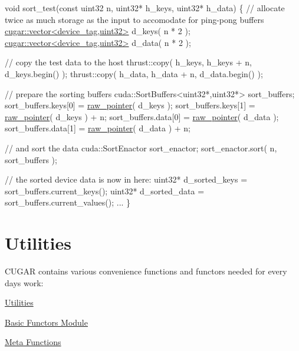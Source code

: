 \begin{DoxyCode}
\textcolor{keywordtype}{void} sort\_test(\textcolor{keyword}{const} uint32 n, uint32* h\_keys, uint32* h\_data)
\{
    \textcolor{comment}{// allocate twice as much storage as the input to accomodate for ping-pong buffers}
    \hyperlink{structcugar_1_1vector}{cugar::vector<device\_tag,uint32>} d\_keys( n * 2 );
    \hyperlink{structcugar_1_1vector}{cugar::vector<device\_tag,uint32>} d\_data( n * 2 );

    \textcolor{comment}{// copy the test data to the host}
    thrust::copy( h\_keys, h\_keys + n, d\_keys.begin() );
    thrust::copy( h\_data, h\_data + n, d\_data.begin() );

    \textcolor{comment}{// prepare the sorting buffers}
    cuda::SortBuffers<uint32*,uint32*> sort\_buffers;
    sort\_buffers.keys[0] = \hyperlink{namespacecugar_a3f6cb2c817f2ba065931cec569aa848b}{raw\_pointer}( d\_keys );
    sort\_buffers.keys[1] = \hyperlink{namespacecugar_a3f6cb2c817f2ba065931cec569aa848b}{raw\_pointer}( d\_keys ) + n;
    sort\_buffers.data[0] = \hyperlink{namespacecugar_a3f6cb2c817f2ba065931cec569aa848b}{raw\_pointer}( d\_data );
    sort\_buffers.data[1] = \hyperlink{namespacecugar_a3f6cb2c817f2ba065931cec569aa848b}{raw\_pointer}( d\_data ) + n;

    \textcolor{comment}{// and sort the data}
    cuda::SortEnactor sort\_enactor;
    sort\_enactor.sort( n, sort\_buffers );

    \textcolor{comment}{// the sorted device data is now in here:}
    uint32* d\_sorted\_keys = sort\_buffers.current\_keys();
    uint32* d\_sorted\_data = sort\_buffers.current\_values();
    ...
\}
\end{DoxyCode}
 \hypertarget{utilities_page}{}\section{Utilities}\label{utilities_page}
C\+U\+G\+AR contains various convenience functions and functors needed for every day\textquotesingle{}s work\+:


\begin{DoxyItemize}
\item \hyperlink{group___basic_utils}{Utilities}
\item \hyperlink{group___basic_functors}{Basic Functors Module}
\item \hyperlink{group___basic_meta_functions}{Meta Functions} 
\end{DoxyItemize}